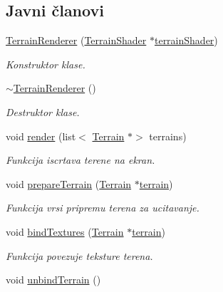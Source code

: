 \subsection*{Javni članovi}
\begin{DoxyCompactItemize}
\item 
\hyperlink{classcore_1_1TerrainRenderer_aef52c32054bf2be3fc5ec160a2d7433b}{Terrain\+Renderer} (\hyperlink{classshader_1_1TerrainShader}{Terrain\+Shader} $\ast$\hyperlink{classcore_1_1TerrainRenderer_a6db721ffef6f7175977ad243b4ac2834}{terrain\+Shader})
\begin{DoxyCompactList}\small\item\em Konstruktor klase. \end{DoxyCompactList}\item 
\hyperlink{classcore_1_1TerrainRenderer_a18e79e2c14c4f2196d410bbde7b85060}{$\sim$\+Terrain\+Renderer} ()
\begin{DoxyCompactList}\small\item\em Destruktor klase. \end{DoxyCompactList}\item 
void \hyperlink{classcore_1_1TerrainRenderer_a1f2aaf851e780fc8f78aa5bb3cd1b512}{render} (list$<$ \hyperlink{classterrain_1_1Terrain}{Terrain} $\ast$$>$ terrains)
\begin{DoxyCompactList}\small\item\em Funkcija iscrtava terene na ekran. \end{DoxyCompactList}\item 
void \hyperlink{classcore_1_1TerrainRenderer_ad4e7d88767cdfc19ee07bf3558f6c1f0}{prepare\+Terrain} (\hyperlink{classterrain_1_1Terrain}{Terrain} $\ast$\hyperlink{namespacecore_ac45da6f80dac9bead5c9310c27897f15}{terrain})
\begin{DoxyCompactList}\small\item\em Funkcija vrsi pripremu terena za ucitavanje. \end{DoxyCompactList}\item 
void \hyperlink{classcore_1_1TerrainRenderer_ac66bf45a30d7c1b443f8b77132112fe0}{bind\+Textures} (\hyperlink{classterrain_1_1Terrain}{Terrain} $\ast$\hyperlink{namespacecore_ac45da6f80dac9bead5c9310c27897f15}{terrain})
\begin{DoxyCompactList}\small\item\em Funkcija povezuje teksture terena. \end{DoxyCompactList}\item 
void \hyperlink{classcore_1_1TerrainRenderer_ac739a96169a8fef7bfad56bbe3367962}{unbind\+Terrain} ()
$$
\end{DoxyCompactItemize}
